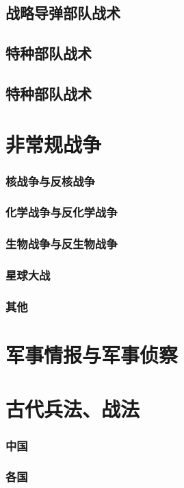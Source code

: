 \documentclass[UTF8]{../ApplicationUniverse}
\begin{document}
    \subsection{战略导弹部队战术}
    \subsection{特种部队战术}
    \subsection{特种部队战术}

\section{非常规战争}
        \subsubsection{核战争与反核战争}
        \subsubsection{化学战争与反化学战争}
        \subsubsection{生物战争与反生物战争}
        \subsubsection{星球大战}
        \subsubsection{其他}
\section{军事情报与军事侦察}
\section{古代兵法、战法}
        \subsubsection{中国}
        \subsubsection{各国}
\end{document}
